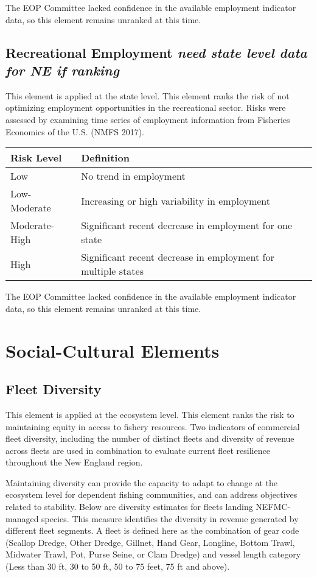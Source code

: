 \documentclass[11pt,]{article}
\begin{document}
The EOP Committee lacked confidence in the available employment
indicator data, so this element remains unranked at this time.

\subsection{\texorpdfstring{Recreational Employment \emph{need state
level data for NE if
ranking}}{Recreational Employment need state level data for NE if ranking}}\label{recreational-employment-need-state-level-data-for-ne-if-ranking}

This element is applied at the state level. This element ranks the risk
of not optimizing employment opportunities in the recreational sector.
Risks were assessed by examining time series of employment information
from Fisheries Economics of the U.S. (NMFS 2017).

\begin{longtable}[]{@{}ll@{}}
\toprule
Risk Level & Definition\tabularnewline
\midrule
\endhead
Low & No trend in employment\tabularnewline
Low-Moderate & Increasing or high variability in
employment\tabularnewline
Moderate-High & Significant recent decrease in employment for one
state\tabularnewline
High & Significant recent decrease in employment for multiple
states\tabularnewline
\bottomrule
\end{longtable}

The EOP Committee lacked confidence in the available employment
indicator data, so this element remains unranked at this time.

\section{Social-Cultural Elements}\label{social-cultural-elements}

\subsection{Fleet Diversity}\label{fleet-diversity}

This element is applied at the ecosystem level. This element ranks the
risk to maintaining equity in access to fishery resources. Two
indicators of commercial fleet diversity, including the number of
distinct fleets and diversity of revenue across fleets are used in
combination to evaluate current fleet resilience throughout the New
England region.

Maintaining diversity can provide the capacity to adapt to change at the
ecosystem level for dependent fishing communities, and can address
objectives related to stability. Below are diversity estimates for
fleets landing NEFMC-managed species. This measure identifies the
diversity in revenue generated by different fleet segments. A fleet is
defined here as the combination of gear code (Scallop Dredge, Other
Dredge, Gillnet, Hand Gear, Longline, Bottom Trawl, Midwater Trawl, Pot,
Purse Seine, or Clam Dredge) and vessel length category (Less than 30
ft, 30 to 50 ft, 50 to 75 feet, 75 ft and above).
\end{document}
